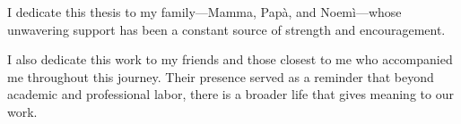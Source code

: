
\begin{dedication}
I dedicate this thesis to my family—Mamma, Papà, and Noemì—whose unwavering support has been a constant source of strength and encouragement.

I also dedicate this work to my friends and those closest to me who accompanied me throughout this journey. 
Their presence served as a reminder that beyond academic and professional labor, there is a broader life that gives meaning to our work.

\end{dedication}

